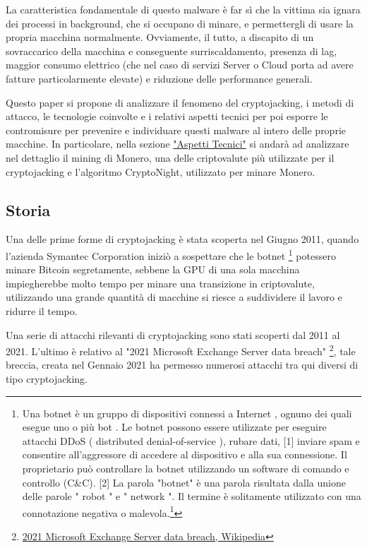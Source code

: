 \documentclass[12pt,a4paper]{article}
\begin{document}
La caratteristica fondamentale di questo malware è far sì che la vittima sia
ignara dei processi in background, che si occupano di minare, e permettergli di
usare la propria macchina normalmente. Ovviamente, il tutto, a discapito di un
sovraccarico della macchina e conseguente surriscaldamento, presenza di lag,
maggior consumo elettrico (che nel caso di servizi Server o Cloud porta ad avere
fatture particolarmente elevate) e riduzione delle performance generali.

Questo paper si propone di analizzare il fenomeno del cryptojacking, i metodi di
attacco, le tecnologie coinvolte e i relativi aspetti tecnici per poi esporre le
contromisure per prevenire e individuare questi malware al intero delle proprie
macchine. In particolare, nella sezione \hyperref[sec:aspetti_tecnici]{"Aspetti
Tecnici"} si andarà ad analizzare nel dettaglio il mining di Monero, una delle
criptovalute più utilizzate per il cryptojacking e l'algoritmo CryptoNight,
utilizzato per minare Monero.

\subsection{Storia}

Una delle prime forme di cryptojacking è stata scoperta nel Giugno 2011, quando
l'azienda Symantec Corporation iniziò a sospettare che le botnet \footnote{ Una
botnet è un gruppo di dispositivi connessi a Internet , ognuno dei quali esegue
uno o più bot . Le botnet possono essere utilizzate per eseguire attacchi DDoS (
distributed denial-of-service ), rubare dati, [1] inviare spam e consentire
all'aggressore di accedere al dispositivo e alla sua connessione. Il
proprietario può controllare la botnet utilizzando un software di comando e
controllo (C\&C). [2] La parola "botnet" è una parola risultata dalla unione
delle parole " robot " e " network ". Il termine è solitamente utilizzato con
una connotazione negativa o
malevola.\footnote{\href{https://arc.net/l/quote/ftyxgxms}{Botnet, Wikipedia}}}
potessero minare Bitcoin segretamente, sebbene la GPU di una sola macchina
impiegherebbe molto tempo per minare una transizione in criptovalute,
utilizzando una grande quantità di macchine si riesce a suddividere il lavoro e
ridurre il tempo.

Una serie di attacchi rilevanti di cryptojacking sono stati scoperti dal 2011 al
2021. L'ultimo è relativo al "2021 Microsoft Exchange Server data breach"
\footnote{\href{https://arc.net/l/quote/golshtco}{2021 Microsoft Exchange Server
data breach, Wikipedia}}, tale breccia, creata nel Gennaio 2021 ha permesso
numerosi attacchi tra qui diversi di tipo cryptojacking.
\end{document}
